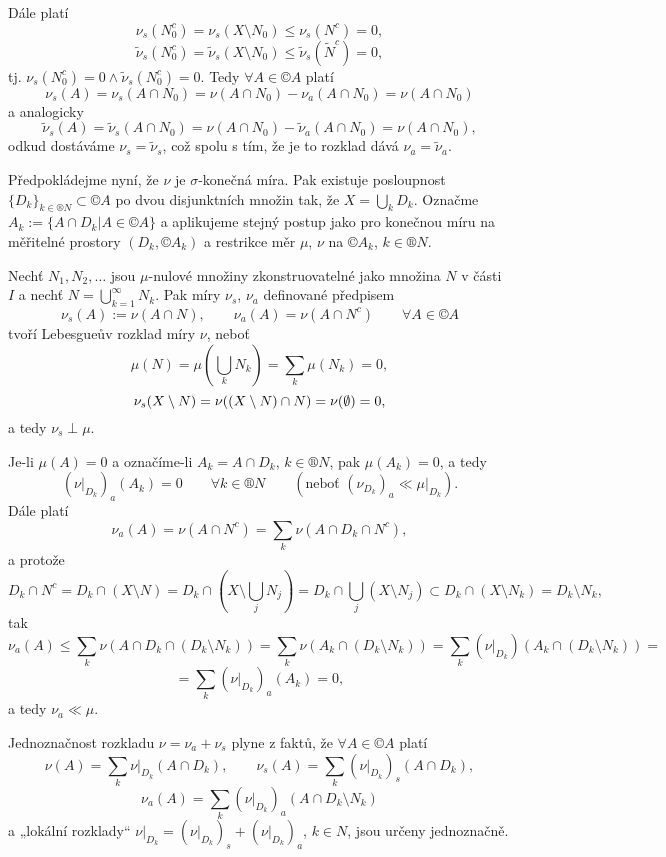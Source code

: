 \documentclass[12pt]{article}					%
\begin{document}
\begin{veta}
\begin{dukazin}
		Dále platí
		$$ \nu_s(N_0^c) = \nu_s (X \setminus N_0) ≤ \nu_s(N^c) = 0, $$
		$$ \tilde \nu_s(N_0^c) = \tilde \nu_s (X \setminus N_0) ≤ \tilde \nu_s(\tilde N^c) = 0, $$
		tj. $\nu_s(N_0^c) = 0 \land \tilde \nu_s(N_0^c) = 0$. Tedy $\forall A \in ©A$ platí
		$$ \nu_s(A) = \nu_s(A \cap N_0) = \nu(A \cap N_0) - \nu_a(A \cap N_0) = \nu(A \cap N_0) $$
		a analogicky
		$$ \tilde \nu_s(A) = \tilde \nu_s(A \cap N_0) = \nu(A \cap N_0) - \tilde \nu_a(A \cap N_0) = \nu(A \cap N_0), $$
		odkud dostáváme $\nu_s = \tilde \nu_s$, což spolu s tím, že je to rozklad dává $\nu_a = \tilde \nu_a$.
	\end{dukazin}

	\begin{dukazin}
		Předpokládejme nyní, že $\nu$ je $\sigma$-konečná míra. Pak existuje posloupnost $\{D_k\}_{k \in ®N} \subset ©A$ po dvou disjunktních množin tak, že $X = \bigcup_k D_k$. Označme $A_k := \{A \cap D_k | A \in ©A\}$ a aplikujeme stejný postup jako pro konečnou míru na měřitelné prostory $(D_k, ©A_k)$ a restrikce měr $\mu$, $\nu$ na $©A_k$, $k \in ®N$.

		Nechť $N_1, N_2, …$ jsou $\mu$-nulové množiny zkonstruovatelné jako množina $N$ v části $I$ a nechť $N = \bigcup_{k=1}^∞ N_k$. Pak míry $\nu_s$, $\nu_a$ definované předpisem
		$$ \nu_s(A) := \nu(A \cap N), \qquad \nu_a(A) = \nu(A \cap N^c) \qquad \forall A \in ©A $$
		tvoří Lebesgueův rozklad míry $\nu$, neboť
		$$ \mu(N) = \mu(\bigcup_k N_k) = \sum_k \mu(N_k) = 0, $$
		$$ \nu_s(X \setminus N) = \nu((X \setminus N) \cap N) = \nu(\emptyset) = 0, $$
		a tedy $\nu_s \perp \mu$.

		Je-li $\mu(A) = 0$ a označíme-li $A_k = A \cap D_k$, $k \in ®N$, pak $\mu(A_k) = 0$, a tedy
		$$ (\nu|_{D_k})_a(A_k) = 0 \qquad \forall k \in ®N \qquad (\text{neboť } (\nu_{D_k})_a \ll \mu|_{D_k}). $$
		Dále platí
		$$ \nu_a(A) = \nu(A \cap N^c) = \sum_k \nu(A \cap D_k \cap N^c), $$
		a protože
		$$ D_k \cap N^c = D_k \cap (X \setminus N) = D_k \cap (X \setminus \bigcup_j N_j) = D_k \cap \bigcup_j (X \setminus N_j) \subset D_k \cap (X \setminus N_k) = D_k \setminus N_k, $$
		tak
		$$ \nu_a(A) ≤ \sum_k \nu(A \cap D_k \cap (D_k \setminus N_k)) = \sum_k \nu(A_k \cap (D_k \setminus N_k)) = \sum_k (\nu|_{D_k})(A_k \cap (D_k \setminus N_k)) = $$
		$$ = \sum_k(\nu|_{D_k})_a(A_k) = 0, $$
		a tedy $\nu_a \ll \mu$.

		Jednoznačnost rozkladu $\nu = \nu_a + \nu_s$ plyne z faktů, že $\forall A \in ©A$ platí
		$$ \nu(A) = \sum_k \nu|_{D_k} (A \cap D_k), \qquad \nu_s(A) = \sum_k(\nu|_{D_k})_s (A \cap D_k), $$
		$$ \nu_a(A) = \sum_k (\nu|_{D_k})_a (A \cap D_k \setminus N_k) $$
		a „lokální rozklady“ $\nu|_{D_k} = (\nu|_{D_k})_s + (\nu|_{D_k})_a$, $k \in N$, jsou určeny jednoznačně.
	\end{dukazin}
\end{veta}
\end{document}
